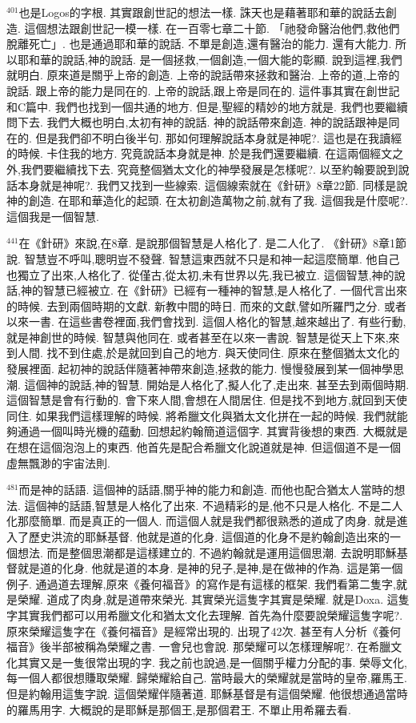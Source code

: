 \documentclass{book}
\begin{document}
$^{401}$也是Logos的字根.
其實跟創世記的想法一樣.
誅天也是藉著耶和華的說話去創造.
這個想法跟創世記一模一樣.
在一百零七章二十節.
「祂發命醫治他們,救他們脫離死亡」.
也是通過耶和華的說話.
不單是創造,還有醫治的能力.
還有大能力.
所以耶和華的說話,神的說話.
是一個拯救,一個創造,一個大能的彰顯.
說到這裡,我們就明白.
原來道是關乎上帝的創造.
上帝的說話帶來拯救和醫治.
上帝的道,上帝的說話.
跟上帝的能力是同在的.
上帝的說話,跟上帝是同在的.
這件事其實在創世記和C篇中.
我們也找到一個共通的地方.
但是,聖經的精妙的地方就是.
我們也要繼續問下去.
我們大概也明白,太初有神的說話.
神的說話帶來創造.
神的說話跟神是同在的.
但是我們卻不明白後半句.
那如何理解說話本身就是神呢?.
這也是在我讀經的時候.
卡住我的地方.
究竟說話本身就是神.
於是我們還要繼續.
在這兩個經文之外,我們要繼續找下去.
究竟整個猶太文化的神學發展是怎樣呢?.
以至約翰要說到說話本身就是神呢?.
我們又找到一些線索.
這個線索就在《針研》8章22節.
同樣是說神的創造.
在耶和華造化的起頭.
在太初創造萬物之前,就有了我.
這個我是什麼呢?.
這個我是一個智慧.

$^{441}$在《針研》來說,在8章.
是說那個智慧是人格化了.
是二人化了.
《針研》8章1節說.
智慧豈不呼叫,聰明豈不發聲.
智慧這東西就不只是和神一起這麼簡單.
他自己也獨立了出來,人格化了.
從僅古,從太初,未有世界以先,我已被立.
這個智慧,神的說話,神的智慧已經被立.
在《針研》已經有一種神的智慧,是人格化了.
一個代言出來的時候.
去到兩個時期的文獻.
新教中間的時日.
而來的文獻,譬如所羅門之分.
或者以來一書.
在這些書卷裡面,我們會找到.
這個人格化的智慧,越來越出了.
有些行動,就是神創世的時候.
智慧與他同在.
或者甚至在以來一書說.
智慧是從天上下來,來到人間.
找不到住處,於是就回到自己的地方.
與天使同住.
原來在整個猶太文化的發展裡面.
起初神的說話伴隨著神帶來創造,拯救的能力.
慢慢發展到某一個神學思潮.
這個神的說話,神的智慧.
開始是人格化了,擬人化了,走出來.
甚至去到兩個時期.
這個智慧是會有行動的.
會下來人間,會想在人間居住.
但是找不到地方,就回到天使同住.
如果我們這樣理解的時候.
將希臘文化與猶太文化拼在一起的時候.
我們就能夠通過一個叫時光機的蕴動.
回想起約翰簡道這個字.
其實背後想的東西.
大概就是在想在這個泡泡上的東西.
他首先是配合希臘文化說道就是神.
但這個道不是一個虛無飄渺的宇宙法則.

$^{481}$而是神的話語.
這個神的話語,關乎神的能力和創造.
而他也配合猶太人當時的想法.
這個神的話語,智慧是人格化了出來.
不過精彩的是,他不只是人格化.
不是二人化那麼簡單.
而是真正的一個人.
而這個人就是我們都很熟悉的道成了肉身.
就是進入了歷史洪流的耶穌基督.
他就是道的化身.
這個道的化身不是約翰創造出來的一個想法.
而是整個思潮都是這樣建立的.
不過約翰就是運用這個思潮.
去說明耶穌基督就是道的化身.
他就是道的本身.
是神的兒子,是神,是在做神的作為.
這是第一個例子.
通過道去理解,原來《養何福音》的寫作是有這樣的框架.
我們看第二隻字,就是榮耀.
道成了肉身,就是道帶來榮光.
其實榮光這隻字其實是榮耀.
就是Doxa.
這隻字其實我們都可以用希臘文化和猶太文化去理解.
首先為什麼要說榮耀這隻字呢?.
原來榮耀這隻字在《養何福音》是經常出現的.
出現了42次.
甚至有人分析《養何福音》後半部被稱為榮耀之書.
一會兒也會說.
那榮耀可以怎樣理解呢?.
在希臘文化其實又是一隻很常出現的字.
我之前也說過,是一個關乎權力分配的事.
榮辱文化,每一個人都很想賺取榮耀.
歸榮耀給自己.
當時最大的榮耀就是當時的皇帝,羅馬王.
但是約翰用這隻字說.
這個榮耀伴隨著道.
耶穌基督是有這個榮耀.
他很想通過當時的羅馬用字.
大概說的是耶穌是那個王,是那個君王.
不單止用希羅去看.
\end{document}
